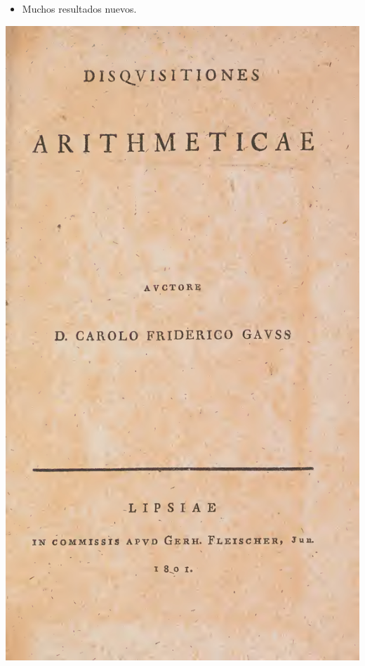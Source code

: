 \begin{frame}
\begin{minipage}[t][0.6\textheight]{0.6\textwidth}
\begin{itemize}
    \item<7-> Muchos resultados nuevos.
    \end{itemize}
  \end{minipage}
  \begin{minipage}[t]{0.35\textwidth}
    \vspace{0pt}\flushright
    \includegraphics[width=.9\textwidth]{disquisitiones.jpg}
  \end{minipage}
\end{frame}

